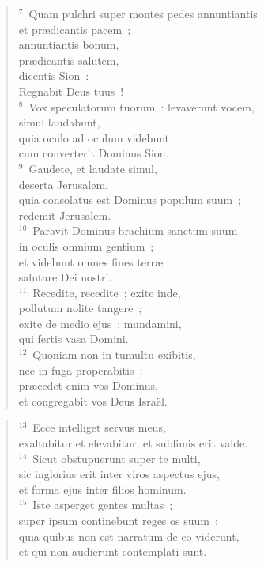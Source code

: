 \begin{verse}${}^{7}$~Quam pulchri super montes pedes annuntiantis\\ et pr\ae dicantis pacem~;\\ annuntiantis bonum,\\ pr\ae dicantis salutem,\\ dicentis Sion~:\\ Regnabit Deus tuus~!\\
${}^{8}$~Vox speculatorum tuorum~: levaverunt vocem,\\ simul laudabunt,\\ quia oculo ad oculum videbunt\\ cum converterit Dominus Sion.\\
${}^{9}$~Gaudete, et laudate simul,\\ deserta Jerusalem,\\ quia consolatus est Dominus populum suum~;\\ redemit Jerusalem.\\
${}^{10}$~Paravit Dominus brachium sanctum suum\\ in oculis omnium gentium~;\\ et videbunt omnes fines terr\ae \\ salutare Dei nostri.\\
${}^{11}$~Recedite, recedite~; exite inde,\\ pollutum nolite tangere~;\\ exite de medio ejus~; mundamini,\\ qui fertis vasa Domini.\\
${}^{12}$~Quoniam non in tumultu exibitis,\\ nec in fuga properabitis~;\\ pr\ae cedet enim vos Dominus,\\ et congregabit vos Deus Isra\"el.\end{verse}


\begin{verse}${}^{13}$~Ecce intelliget servus meus,\\ exaltabitur et elevabitur, et sublimis erit valde.\\
${}^{14}$~Sicut obstupuerunt super te multi,\\ sic inglorius erit inter viros aspectus ejus,\\ et forma ejus inter filios hominum.\\
${}^{15}$~Iste asperget gentes multas~;\\ super ipsum continebunt reges os suum~:\\ quia quibus non est narratum de eo viderunt,\\ et qui non audierunt contemplati sunt.\end{verse}



